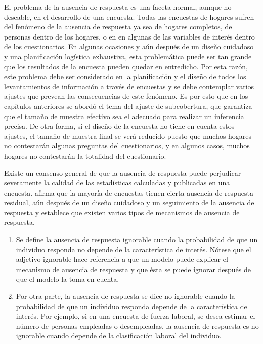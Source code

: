 \documentclass[
  12pt,
]{book}
\providecommand{\tightlist}{%
  \setlength{\itemsep}{0pt}\setlength{\parskip}{0pt}}
\begin{document}
El problema de la ausencia de respuesta es una faceta normal, aunque no deseable, en el desarrollo de una encuesta. Todas las encuestas de hogares sufren del fenómeno de la ausencia de respuesta ya sea de hogares completos, de personas dentro de los hogares, o en en algunas de las variables de interés dentro de los cuestionarios. En algunas ocasiones y aún después de un diseño cuidadoso y una planificación logística exhaustiva, esta problemática puede ser tan grande que los resultados de la encuesta pueden quedar en entredicho. Por esta razón, este problema debe ser considerado en la planificación y el diseño de todos los levantamientos de información a través de encuestas y se debe contemplar varios ajustes que prevean las consecuencias de este fenómeno. Es por esto que en los capítulos anteriores se abordó el tema del ajuste de subcobertura, que garantiza que el tamaño de muestra efectivo sea el adecuado para realizar un inferencia precisa. De otra forma, si el diseño de la encuesta no tiene en cuenta estos ajustes, el tamaño de muestra final se verá reducido puesto que muchos hogares no contestarán algunas preguntas del cuestionarios, y en algunos casos, muchos hogares no contestarán la totalidad del cuestionario.

Existe un consenso general de que la ausencia de respuesta puede perjudicar severamente la calidad de las estadísticas calculadas y publicadas en una encuesta. \citet{Lohr_2019} afirma que la mayoría de encuestas tienen cierta ausencia de respuesta residual, aún después de un diseño cuidadoso y un seguimiento de la ausencia de respuesta y establece que existen varios tipos de mecanismos de ausencia de respuesta.

\begin{enumerate}
\def\labelenumi{\arabic{enumi}.}
\tightlist
\item
  Se define la ausencia de respuesta ignorable cuando la probabilidad de que un individuo responda no depende de la característica de interés. Nótese que el adjetivo ignorable hace referencia a que un modelo puede explicar el mecanismo de ausencia de respuesta y que ésta se puede ignorar después de que el modelo la toma en cuenta.
\item
  Por otra parte, la ausencia de respuesta se dice no ignorable cuando la probabilidad de que un individuo responda depende de la característica de interés. Por ejemplo, si en una encuesta de fuerza laboral, se desea estimar el número de personas empleadas o desempleadas, la ausencia de respuesta es no ignorable cuando depende de la clasificación laboral del individuo.
\end{enumerate}
\end{document}
